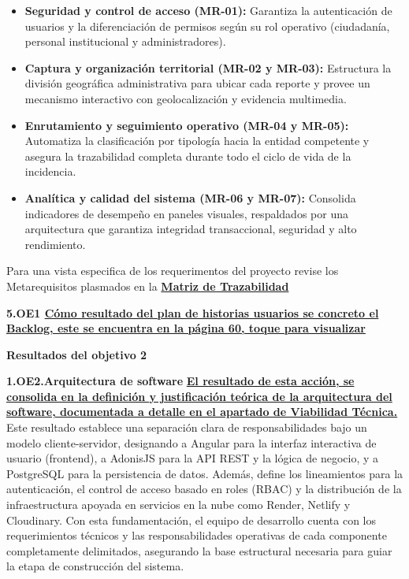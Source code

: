 {\begin{itemize}
	\item \textbf{Seguridad y control de acceso (MR-01):} Garantiza la autenticación de usuarios y la diferenciación de permisos según su rol operativo (ciudadanía, personal institucional y administradores).
	\item \textbf{Captura y organización territorial (MR-02 y MR-03):} Estructura la división geográfica administrativa para ubicar cada reporte y provee un mecanismo interactivo con geolocalización y evidencia multimedia.
	\item \textbf{Enrutamiento y seguimiento operativo (MR-04 y MR-05):} Automatiza la clasificación por tipología hacia la entidad competente y asegura la trazabilidad completa durante todo el ciclo de vida de la incidencia.
	\item \textbf{Analítica y calidad del sistema (MR-06 y MR-07):} Consolida indicadores de desempeño en paneles visuales, respaldados por una arquitectura que garantiza integridad transaccional, seguridad y alto rendimiento.
\end{itemize}
 Para una vista especifica de los requerimentos del proyecto revise los Metarequisitos plasmados en la \textbf{\hyperlink{subsec:matriz}{Matriz de Trazabilidad}} 
 
 \textbf{5.\hypertarget{subsec:backlog}{OE1} \hyperlink{subsec:backlog1}{Cómo resultado del plan de historias usuarios se concreto el Backlog, este se encuentra en la página 60, toque para visualizar}}
 
 \textbf{Resultados del objetivo 2}

 \textbf{1.\hypertarget{subsec:arquitecturaSoftware}{OE2.Arquitectura de software}} \textbf{\hyperlink{subsec:viabiTec}{El resultado de esta acción, se consolida en la definición y justificación teórica de la arquitectura del software, documentada a detalle en el apartado de Viabilidad Técnica.}} Este resultado establece una separación clara de responsabilidades bajo un modelo cliente-servidor, designando a Angular para la interfaz interactiva de usuario (frontend), a AdonisJS para la API REST y la lógica de negocio, y a PostgreSQL para la persistencia de datos. Además, define los lineamientos para la autenticación, el control de acceso basado en roles (RBAC) y la distribución de la infraestructura apoyada en servicios en la nube como Render, Netlify y Cloudinary. Con esta fundamentación, el equipo de desarrollo cuenta con los requerimientos técnicos y las responsabilidades operativas de cada componente completamente delimitados, asegurando la base estructural necesaria para guiar la etapa de construcción del sistema.
 
}
